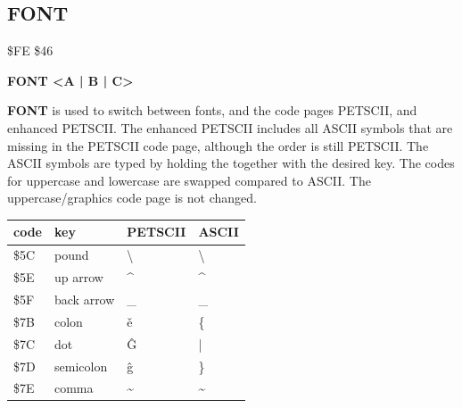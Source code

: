 \subsection{FONT}
\begin{description}[leftmargin=2cm,style=nextline]
\item [Token:] \$FE \$46
\item [Format:] {\bf FONT <A | B | C>}
\item [Usage:] {\bf FONT} is used to switch between fonts,
               and the code pages PETSCII, and enhanced PETSCII.
               The enhanced PETSCII includes all ASCII symbols that
               are missing in the PETSCII code page, although the order
               is still PETSCII.
               The ASCII symbols are typed by holding the \megasymbolkey
               together with the desired key.
               The codes for uppercase and lowercase
               are swapped compared to ASCII.
               The uppercase/graphics code page is not changed.
\begin{center}
\ttfamily
{\setlength{\tabcolsep}{1mm}
\begin{tabular}{*{4}{|R{2.0cm}}|}
\hline
 code  &   key & PETSCII & ASCII  \\
\hline
\$5C & pound      & {\codefont \textbackslash}   & \textbackslash  \\
\$5E & up arrow   & {\codefont \textasciicircum} & \textasciicircum  \\
\$5F & back arrow & {\codefont \_}               & \_   \\
\$7B & colon      & {\codefont ě }               & \{   \\
\$7C & dot        & {\codefont Ĝ }               &  |   \\
\$7D & semicolon  & {\codefont ĝ }               & \}   \\
\$7E & comma      & {\codefont \textasciitilde}  & \textasciitilde   \\
\hline
\end{tabular}
}
\end{center}

%
%
%



\end{description}
